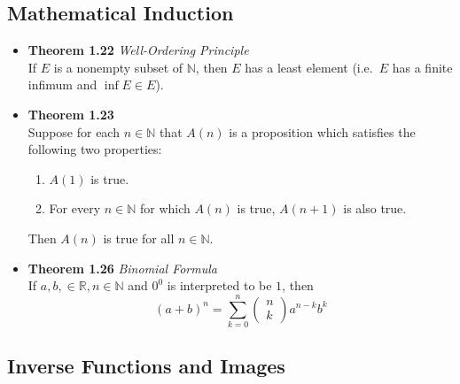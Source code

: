 \documentclass[11pt,a4paper]{article}
\begin{document}
\subsection{Mathematical Induction}

\begin{itemize}
    \item \textbf{Theorem 1.22} \emph{Well-Ordering Principle} \\
        If $E$ is a nonempty subset of $\mathbb{N}$, then $E$ has a least element
        (i.e.\ $E$ has a finite infimum and $\inf E \in E$).

    \item \textbf{Theorem 1.23} \\
        Suppose for each $n \in \mathbb{N}$ that $A(n)$ is a proposition which satisfies
        the following two properties:
        \begin{enumerate}
            \item $A(1)$ is true.
            \item For every $n \in \mathbb{N}$ for which $A(n)$ is true, $A(n+1)$ is also true.
        \end{enumerate}
        Then $A(n)$ is true for all $n \in \mathbb{N}$.

    \item \textbf{Theorem 1.26} \emph{Binomial Formula} \\
        If $a, b, \in \mathbb{R}, n \in \mathbb{N}$ and $0^0$ is interpreted to be $1$, then
        \[
            {(a+b)}^n = \sum_{k=0}^n
            \begin{pmatrix}
                n \\ k
            \end{pmatrix}
            a^{n-k} b^k
        \]

\end{itemize}

\subsection{Inverse Functions and Images}
\end{document}
